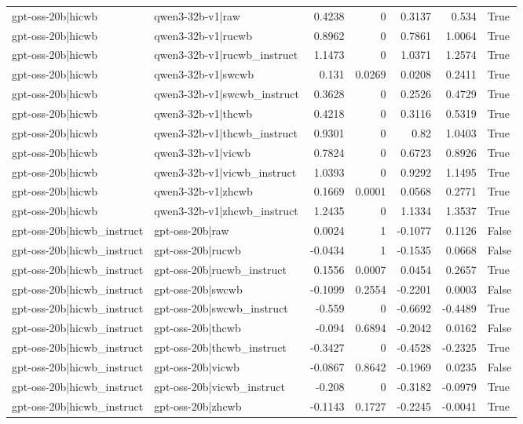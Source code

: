 \begin{table}
\begin{tabular}{l l r r r r l}
gpt-oss-20b|hicwb & qwen3-32b-v1|raw & 0.4238 & 0 & 0.3137 & 0.534 & True \\
gpt-oss-20b|hicwb & qwen3-32b-v1|rucwb & 0.8962 & 0 & 0.7861 & 1.0064 & True \\
gpt-oss-20b|hicwb & qwen3-32b-v1|rucwb_instruct & 1.1473 & 0 & 1.0371 & 1.2574 & True \\
gpt-oss-20b|hicwb & qwen3-32b-v1|swcwb & 0.131 & 0.0269 & 0.0208 & 0.2411 & True \\
gpt-oss-20b|hicwb & qwen3-32b-v1|swcwb_instruct & 0.3628 & 0 & 0.2526 & 0.4729 & True \\
gpt-oss-20b|hicwb & qwen3-32b-v1|thcwb & 0.4218 & 0 & 0.3116 & 0.5319 & True \\
gpt-oss-20b|hicwb & qwen3-32b-v1|thcwb_instruct & 0.9301 & 0 & 0.82 & 1.0403 & True \\
gpt-oss-20b|hicwb & qwen3-32b-v1|vicwb & 0.7824 & 0 & 0.6723 & 0.8926 & True \\
gpt-oss-20b|hicwb & qwen3-32b-v1|vicwb_instruct & 1.0393 & 0 & 0.9292 & 1.1495 & True \\
gpt-oss-20b|hicwb & qwen3-32b-v1|zhcwb & 0.1669 & 0.0001 & 0.0568 & 0.2771 & True \\
gpt-oss-20b|hicwb & qwen3-32b-v1|zhcwb_instruct & 1.2435 & 0 & 1.1334 & 1.3537 & True \\
gpt-oss-20b|hicwb_instruct & gpt-oss-20b|raw & 0.0024 & 1 & -0.1077 & 0.1126 & False \\
gpt-oss-20b|hicwb_instruct & gpt-oss-20b|rucwb & -0.0434 & 1 & -0.1535 & 0.0668 & False \\
gpt-oss-20b|hicwb_instruct & gpt-oss-20b|rucwb_instruct & 0.1556 & 0.0007 & 0.0454 & 0.2657 & True \\
gpt-oss-20b|hicwb_instruct & gpt-oss-20b|swcwb & -0.1099 & 0.2554 & -0.2201 & 0.0003 & False \\
gpt-oss-20b|hicwb_instruct & gpt-oss-20b|swcwb_instruct & -0.559 & 0 & -0.6692 & -0.4489 & True \\
gpt-oss-20b|hicwb_instruct & gpt-oss-20b|thcwb & -0.094 & 0.6894 & -0.2042 & 0.0162 & False \\
gpt-oss-20b|hicwb_instruct & gpt-oss-20b|thcwb_instruct & -0.3427 & 0 & -0.4528 & -0.2325 & True \\
gpt-oss-20b|hicwb_instruct & gpt-oss-20b|vicwb & -0.0867 & 0.8642 & -0.1969 & 0.0235 & False \\
gpt-oss-20b|hicwb_instruct & gpt-oss-20b|vicwb_instruct & -0.208 & 0 & -0.3182 & -0.0979 & True \\
gpt-oss-20b|hicwb_instruct & gpt-oss-20b|zhcwb & -0.1143 & 0.1727 & -0.2245 & -0.0041 & True \\

\end{tabular}
\end{table}
